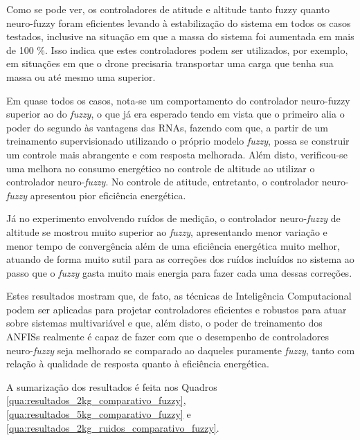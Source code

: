 Como se pode ver, os controladores de atitude e altitude tanto fuzzy quanto neuro-fuzzy foram eficientes levando à estabilização do sistema em todos os casos testados, inclusive na situação em que a massa do sistema foi aumentada em mais de 100 \%. Isso indica que estes controladores podem ser utilizados, por exemplo, em situações em que o drone precisaria transportar uma carga que tenha sua massa ou até mesmo uma superior.

Em quase todos os casos, nota-se um comportamento do controlador neuro-fuzzy superior ao do \textit{fuzzy}, o que já era esperado tendo em vista que o primeiro alia o poder do segundo às vantagens das RNAs, fazendo com que, a partir de um treinamento supervisionado utilizando o próprio modelo \textit{fuzzy}, possa se construir um controle mais abrangente e com resposta melhorada. Além disto, verificou-se uma melhora no consumo energético no controle de altitude ao utilizar o controlador neuro-\textit{fuzzy}. No controle de atitude, entretanto, o controlador neuro-\textit{fuzzy} apresentou pior eficiência energética.

Já no experimento envolvendo ruídos de medição, o controlador neuro-\textit{fuzzy} de altitude se mostrou muito superior ao \textit{fuzzy}, apresentando menor variação e menor tempo de convergência além de uma eficiência energética muito melhor, atuando de forma muito sutil para as correções dos ruídos incluídos no sistema ao passo que o \textit{fuzzy} gasta muito mais energia para fazer cada uma dessas correções.

Estes resultados mostram que, de fato, as técnicas de Inteligência Computacional podem ser aplicadas para projetar controladores eficientes e robustos para atuar sobre sistemas multivariável e que, além disto, o poder de treinamento dos ANFISs realmente é capaz de fazer com que o desempenho de controladores neuro-\textit{fuzzy} seja melhorado se comparado ao daqueles puramente \textit{fuzzy}, tanto com relação à qualidade de resposta quanto à eficiência energética.

A sumarização dos resultados é feita nos Quadros \ref{qua:resultados_2kg_comparativo_fuzzy}, \ref{qua:resultados_5kg_comparativo_fuzzy} e \ref{qua:resultados_2kg_ruidos_comparativo_fuzzy}.







